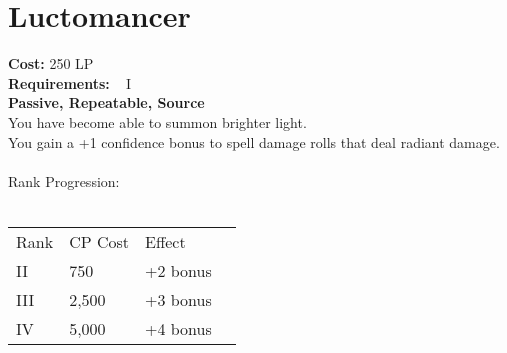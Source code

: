\section{Luctomancer}\label{perk:luctomancer}
\textbf{Cost:} 250 LP\\
\textbf{Requirements:} ~ I\\
\textbf{Passive, Repeatable, Source}\\
You have become able to summon brighter light.\\
You gain a +1 confidence bonus to spell damage rolls that deal radiant damage.\\
\\
Rank Progression:\\
\\
\begin{tabular}{l | l | l | l}
    Rank & CP Cost &  Effect\\
    II & 750 & +2 bonus\\
    III & 2,500 & +3 bonus\\
    IV & 5,000 & +4 bonus\\
\end{tabular}
